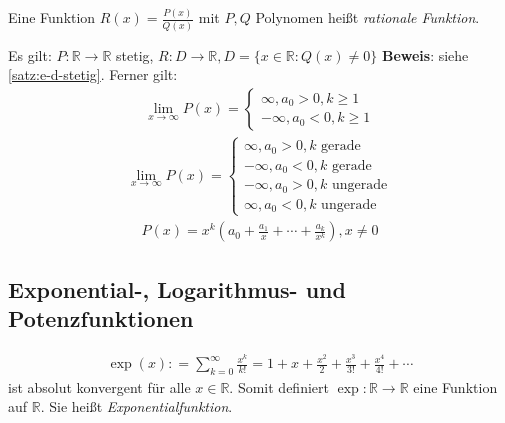 \documentclass[ngerman,titlepage,twoside, parskip=half*]{scrreprt}
\newcommand*{\R}{\mathbb{R}}
\theoremstyle{plain}
\theoremstyle{definition}
\theoremstyle{remark}
\newcommand*{\coloneqq}{\mathrel{\mathop:}=}
\begin{document}
Eine Funktion $R(x)=\frac{P(x)}{Q(x)}$ mit $P,Q$ Polynomen heißt \emph{rationale Funktion}.

Es gilt: $P\colon\R\rightarrow\R$ stetig, $R\colon D\rightarrow\R, D=\{x\in \R\colon Q(x)\neq0\}$
\textbf{Beweis}: siehe \autoref{satz:e-d-stetig}. Ferner gilt:
\begin{gather*}\lim_{x\rightarrow\infty}P(x)=\begin{cases}\infty, a_0>0, k\geq 1\\-\infty, a_0<0, k\geq 1\end{cases}\end{gather*}
\begin{gather*}\lim_{x\rightarrow\infty}P(x)=\begin{cases}\infty, a_0>0, k \text{ gerade}\\-\infty, a_0<0, k \text{ gerade}\\-\infty, a_0>0,
k \text{ ungerade}\\\infty, a_0<0, k \text{ ungerade}\end{cases}\end{gather*}
\begin{gather*}P(x)=x^k(a_0+\frac{a_1}{x}+\cdots + \frac{a_k}{x^k}), x \neq 0\end{gather*}

\subsection{Exponential-, Logarithmus- und Potenzfunktionen}

\begin{gather*}\exp(x)\coloneqq\sum_{k=0}^\infty \frac{x^k}{k!}=1+x+\frac{x^2}{2}+\frac{x^3}{3!}+\frac{x^4}{4!}+\cdots\end{gather*}
ist absolut konvergent für alle $x\in \R$. Somit definiert $\exp\colon\R\rightarrow\R$ eine Funktion auf $\R$. Sie heißt
\emph{Exponentialfunktion}.
\end{document}
